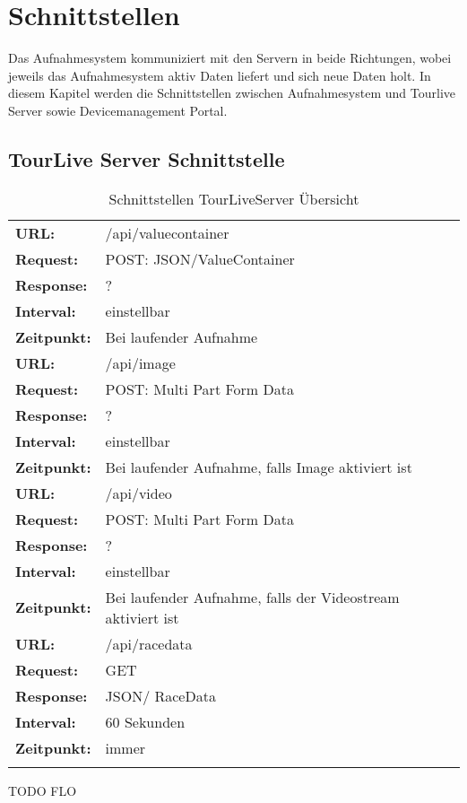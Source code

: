 \chapter{Schnittstellen}

Das Aufnahmesystem kommuniziert mit den Servern in beide Richtungen, wobei jeweils das Aufnahmesystem aktiv Daten liefert und sich neue Daten holt. In diesem Kapitel werden die Schnittstellen zwischen Aufnahmesystem und Tourlive Server sowie Devicemanagement Portal.
 

\section{TourLive Server Schnittstelle}

{\renewcommand{\arraystretch}{1.5}%
    \begin{longtable}{ p{2.5cm}  p{10cm}}

	\textbf{URL:} & /api/valuecontainer \\
	\textbf{Request:} & POST: JSON/ValueContainer \\
	\textbf{Response:} & ?  \\
	\textbf{Interval:} & einstellbar \\
	\textbf{Zeitpunkt:} & Bei laufender Aufnahme \\ 
\hline
\hline
	\textbf{URL:} & /api/image \\
	\textbf{Request:} & POST: Multi Part Form Data \\
	\textbf{Response:} & ?  \\
	\textbf{Interval:} & einstellbar \\
	\textbf{Zeitpunkt:} & Bei laufender Aufnahme, falls Image aktiviert ist \\ 
\hline
\hline
	\textbf{URL:} & /api/video \\
	\textbf{Request:} & POST: Multi Part Form Data \\
	\textbf{Response:} & ?  \\
	\textbf{Interval:} & einstellbar \\
	\textbf{Zeitpunkt:} & Bei laufender Aufnahme, falls der Videostream aktiviert ist \\ 
\hline
\hline
	\textbf{URL:} & /api/racedata \\
	\textbf{Request:} & GET \\
	\textbf{Response:} & JSON/ RaceData  \\
	\textbf{Interval:} & 60 Sekunden \\
	\textbf{Zeitpunkt:} & immer \\ 
\hline
\hline 
\caption{Schnittstellen TourLiveServer Übersicht}
\end{longtable} }
TODO FLO

